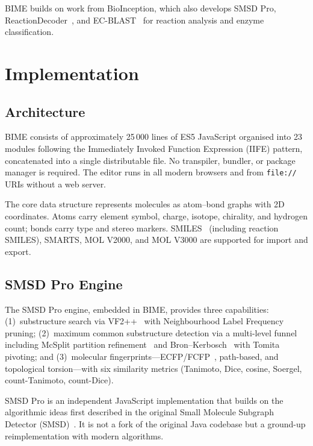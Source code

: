 \documentclass[twocolumn]{article}
\begin{document}
BIME builds on work from BioInception, which also develops
SMSD Pro, ReactionDecoder~\cite{Rahman2016}, and
EC-BLAST~\cite{Rahman2014} for reaction analysis and enzyme
classification.

\section{Implementation}

\subsection{Architecture}

BIME consists of approximately 25\,000 lines of ES5 JavaScript
organised into 23 modules following the Immediately Invoked Function
Expression (IIFE) pattern, concatenated into a single distributable
file.  No transpiler, bundler, or package manager is required.
The editor runs in all modern browsers and from \texttt{file://}
URIs without a web server.

The core data structure represents molecules as atom--bond graphs
with 2D coordinates.  Atoms carry element symbol, charge, isotope,
chirality, and hydrogen count; bonds carry type and stereo markers.
SMILES~\cite{Weininger1988} (including reaction SMILES), SMARTS,
MOL V2000, and MOL V3000 are supported for import and export.

\subsection{SMSD Pro Engine}

The SMSD Pro engine, embedded in BIME, provides three capabilities:
(1)~substructure search via VF2++~\cite{Juttner2018} with
Neighbourhood Label Frequency pruning;
(2)~maximum common substructure detection via a multi-level funnel
including McSplit partition refinement~\cite{McCreesh2017} and
Bron--Kerbosch~\cite{Bron1973} with Tomita pivoting; and
(3)~molecular fingerprints---ECFP/FCFP~\cite{Rogers2010},
path-based, and topological torsion---with six similarity metrics
(Tanimoto, Dice, cosine, Soergel, count-Tanimoto, count-Dice).

SMSD Pro is an independent JavaScript implementation that builds on
the algorithmic ideas first described in the original Small Molecule
Subgraph Detector (SMSD)~\cite{Rahman2009}.  It is not a fork of
the original Java codebase but a ground-up reimplementation with
modern algorithms.
\end{document}
